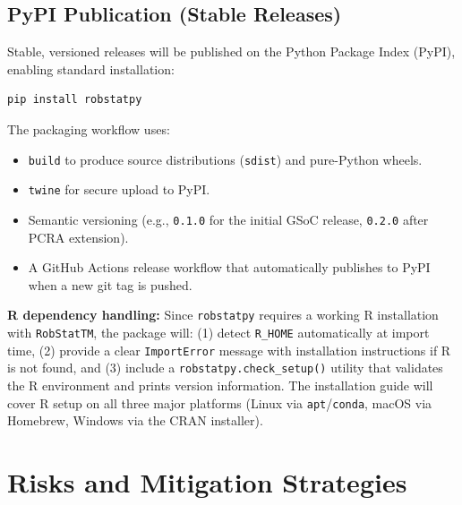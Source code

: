 \documentclass[11pt, a4paper]{article}
\begin{document}
\subsection{PyPI Publication (Stable Releases)}

Stable, versioned releases will be published on the Python Package Index
(PyPI), enabling standard installation:

\begin{lstlisting}[style=python, caption={PyPI installation}, numbers=none]
pip install robstatpy
\end{lstlisting}

\noindent
The packaging workflow uses:
\begin{itemize}[leftmargin=1.5em, itemsep=2pt]
  \item \texttt{build} to produce source distributions (\texttt{sdist})
    and pure-Python wheels.
  \item \texttt{twine} for secure upload to PyPI.
  \item Semantic versioning (e.g., \texttt{0.1.0} for the initial GSoC
    release, \texttt{0.2.0} after PCRA extension).
  \item A GitHub Actions release workflow that automatically publishes
    to PyPI when a new git tag is pushed.
\end{itemize}

\noindent
\textbf{R dependency handling:}
Since \texttt{robstatpy} requires a working R installation with
\texttt{RobStatTM}, the package will:
(1) detect \texttt{R\_HOME} automatically at import time,
(2) provide a clear \texttt{ImportError} message with installation
instructions if R is not found, and
(3) include a \texttt{robstatpy.check\_setup()} utility that validates
the R environment and prints version information.
The installation guide will cover R setup on all three major platforms
(Linux via \texttt{apt}/\texttt{conda}, macOS via Homebrew, Windows via
the CRAN installer).

\section{Risks and Mitigation Strategies}
\end{document}
